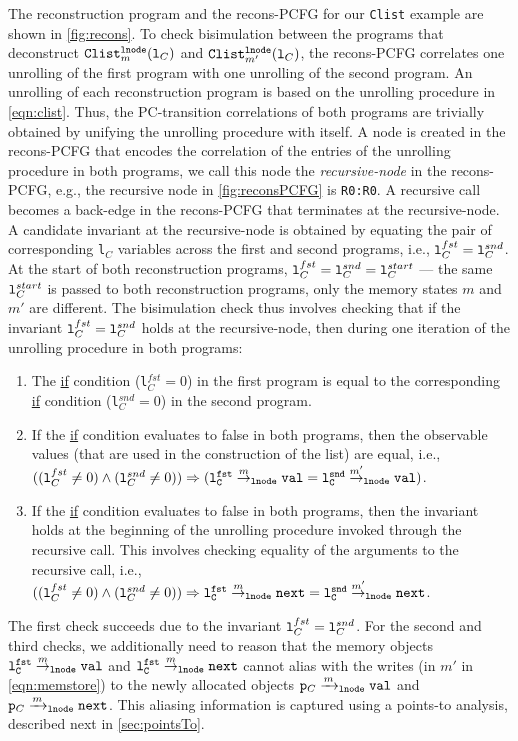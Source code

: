 The reconstruction
program and the recons-PCFG for our {\tt Clist} example
are shown in \cref{fig:recons}.
To check bisimulation
between the programs that deconstruct
${\tt Clist}_m^{{\tt lnode}}({\tt l}_C)$
and ${\tt Clist}_{m'}^{{\tt lnode}}({\tt l}_C)$, the recons-PCFG
correlates one unrolling of the first
program
with one
unrolling of the second program.
An unrolling of each reconstruction
program is based on the unrolling procedure in \cref{eqn:clist}.
Thus, the PC-transition correlations of both programs
are trivially obtained
by unifying the unrolling procedure with itself. A node
is created in the recons-PCFG that
encodes the correlation of the entries of the unrolling procedure in
both programs, we call this node the {\em recursive-node} in the
recons-PCFG, e.g., the
recursive node in \cref{fig:reconsPCFG} is {\tt R0:R0}. A recursive
call becomes a back-edge in the recons-PCFG that terminates at the
recursive-node.
A candidate
invariant at the recursive-node
is obtained by equating the pair of corresponding
{\tt l}$_C$ variables across the first and second
programs, i.e.,
${\tt l}^{fst}_C={\tt l}^{snd}_C$.
At the start of
both reconstruction
programs, ${\tt l}^{fst}_C={\tt l}^{snd}_C={\tt l}^{start}_C$
--- the
same ${\tt l}^{start}_C$ is passed to both reconstruction
programs, only the memory states $m$ and $m'$ are different.
The bisimulation check thus involves checking that
if the invariant
${\tt l}^{fst}_C={\tt l}^{snd}_C$
holds at the recursive-node,
then during one iteration of the unrolling procedure
in both programs:
\begin{enumerate}
\item The \underline{if} condition
({\tt l$^{fst}_C=0$}) in the first program
is equal to the corresponding \underline{if}
condition ({\tt l$^{snd}_C=0$}) in the
second program.
\item If the \underline{if} condition
evaluates to false in both programs, then
the observable values (that are used in the
construction of the list) are equal, i.e.,
$(({\tt l}^{fst}_C\neq 0)\land({\tt l}^{snd}_C\neq 0))\Rightarrow ({\tt {\tt l}^{fst}_C} \overset{m}{\rightarrow}_{\tt lnode} {\tt val}=
{\tt {\tt l}^{snd}_C} \overset{m'}{\rightarrow}_{\tt lnode} {\tt val})$.
\item If the \underline{if} condition
evaluates to false in both programs, then
the invariant holds at the beginning
of the unrolling procedure invoked through the
recursive call.
This involves checking equality
of the arguments to the recursive call, i.e.,
$(({\tt l}^{fst}_C\neq 0)\land({\tt l}^{snd}_C\neq 0))\Rightarrow {\tt {\tt l}^{fst}_C} \overset{m}{\rightarrow}_{\tt lnode} {\tt next}
=
{\tt {\tt l}^{snd}_C} \overset{m'}{\rightarrow}_{\tt lnode} {\tt next}$.
\end{enumerate}
The first check succeeds due to the invariant
${\tt l}^{fst}_C={\tt l}^{snd}_C$.
For the second and third checks, we additionally
need to reason that the memory objects
${\tt {\tt l}^{fst}_C} \overset{m}{\rightarrow}_{\tt lnode} {\tt val}$ and
${\tt {\tt l}^{fst}_C} \overset{m}{\rightarrow}_{\tt lnode} {\tt next}$ cannot
alias with the writes (in $m'$ in \cref{eqn:memstore})
to the newly allocated objects
${\tt p}_C\xrightarrow[]{m}_{\mathrm{\tt lnode}}{\tt val}$
and
${\tt p}_C\xrightarrow[]{m}_{\mathrm{\tt lnode}}{\tt next}$.
This aliasing information is captured using a points-to analysis,
described next in \cref{sec:pointsTo}.

